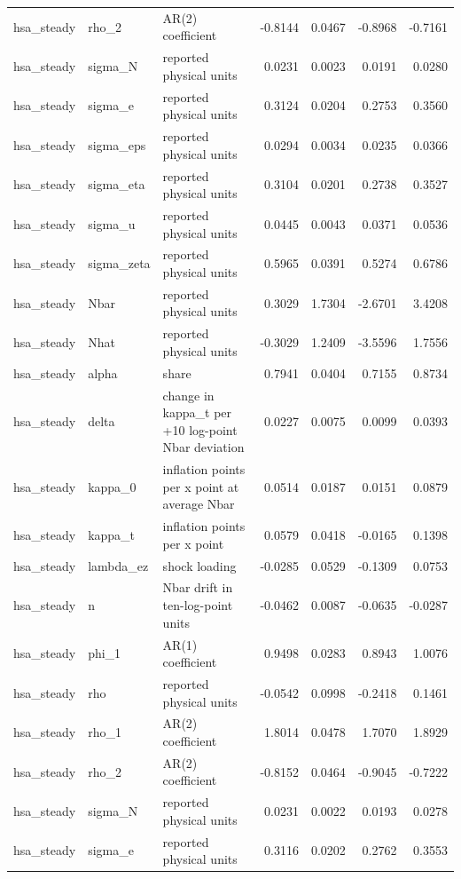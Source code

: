 \begin{tabular}{lllrrrr}
hsa\_steady & rho\_2 & AR(2) coefficient & -0.8144 & 0.0467 & -0.8968 & -0.7161 \\
hsa\_steady & sigma\_N & reported physical units & 0.0231 & 0.0023 & 0.0191 & 0.0280 \\
hsa\_steady & sigma\_e & reported physical units & 0.3124 & 0.0204 & 0.2753 & 0.3560 \\
hsa\_steady & sigma\_eps & reported physical units & 0.0294 & 0.0034 & 0.0235 & 0.0366 \\
hsa\_steady & sigma\_eta & reported physical units & 0.3104 & 0.0201 & 0.2738 & 0.3527 \\
hsa\_steady & sigma\_u & reported physical units & 0.0445 & 0.0043 & 0.0371 & 0.0536 \\
hsa\_steady & sigma\_zeta & reported physical units & 0.5965 & 0.0391 & 0.5274 & 0.6786 \\
hsa\_steady & Nbar & reported physical units & 0.3029 & 1.7304 & -2.6701 & 3.4208 \\
hsa\_steady & Nhat & reported physical units & -0.3029 & 1.2409 & -3.5596 & 1.7556 \\
hsa\_steady & alpha & share & 0.7941 & 0.0404 & 0.7155 & 0.8734 \\
hsa\_steady & delta & change in kappa\_t per +10 log-point Nbar deviation & 0.0227 & 0.0075 & 0.0099 & 0.0393 \\
hsa\_steady & kappa\_0 & inflation points per x point at average Nbar & 0.0514 & 0.0187 & 0.0151 & 0.0879 \\
hsa\_steady & kappa\_t & inflation points per x point & 0.0579 & 0.0418 & -0.0165 & 0.1398 \\
hsa\_steady & lambda\_ez & shock loading & -0.0285 & 0.0529 & -0.1309 & 0.0753 \\
hsa\_steady & n & Nbar drift in ten-log-point units & -0.0462 & 0.0087 & -0.0635 & -0.0287 \\
hsa\_steady & phi\_1 & AR(1) coefficient & 0.9498 & 0.0283 & 0.8943 & 1.0076 \\
hsa\_steady & rho & reported physical units & -0.0542 & 0.0998 & -0.2418 & 0.1461 \\
hsa\_steady & rho\_1 & AR(2) coefficient & 1.8014 & 0.0478 & 1.7070 & 1.8929 \\
hsa\_steady & rho\_2 & AR(2) coefficient & -0.8152 & 0.0464 & -0.9045 & -0.7222 \\
hsa\_steady & sigma\_N & reported physical units & 0.0231 & 0.0022 & 0.0193 & 0.0278 \\
hsa\_steady & sigma\_e & reported physical units & 0.3116 & 0.0202 & 0.2762 & 0.3553 \\

\end{tabular}
